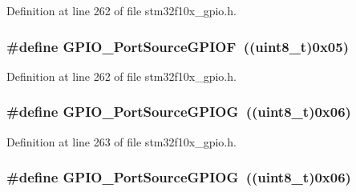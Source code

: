 Definition at line 262 of file stm32f10x\+\_\+gpio.\+h.

\subsubsection[{\texorpdfstring{G\+P\+I\+O\+\_\+\+Port\+Source\+G\+P\+I\+OF}{GPIO_PortSourceGPIOF}}]{\setlength{\rightskip}{0pt plus 5cm}\#define G\+P\+I\+O\+\_\+\+Port\+Source\+G\+P\+I\+OF~(({\bf uint8\+\_\+t})0x05)}\hypertarget{group___g_p_i_o___port___sources_ga19dfaf7ac2cdf66b697bcd8665b860ef}{}\label{group___g_p_i_o___port___sources_ga19dfaf7ac2cdf66b697bcd8665b860ef}


Definition at line 262 of file stm32f10x\+\_\+gpio.\+h.

\subsubsection[{\texorpdfstring{G\+P\+I\+O\+\_\+\+Port\+Source\+G\+P\+I\+OG}{GPIO_PortSourceGPIOG}}]{\setlength{\rightskip}{0pt plus 5cm}\#define G\+P\+I\+O\+\_\+\+Port\+Source\+G\+P\+I\+OG~(({\bf uint8\+\_\+t})0x06)}\hypertarget{group___g_p_i_o___port___sources_ga43af0aa9b42aefa2c7d24dfa9889040b}{}\label{group___g_p_i_o___port___sources_ga43af0aa9b42aefa2c7d24dfa9889040b}


Definition at line 263 of file stm32f10x\+\_\+gpio.\+h.

\subsubsection[{\texorpdfstring{G\+P\+I\+O\+\_\+\+Port\+Source\+G\+P\+I\+OG}{GPIO_PortSourceGPIOG}}]{\setlength{\rightskip}{0pt plus 5cm}\#define G\+P\+I\+O\+\_\+\+Port\+Source\+G\+P\+I\+OG~(({\bf uint8\+\_\+t})0x06)}\hypertarget{group___g_p_i_o___port___sources_ga43af0aa9b42aefa2c7d24dfa9889040b}{}\label{group___g_p_i_o___port___sources_ga43af0aa9b42aefa2c7d24dfa9889040b}


